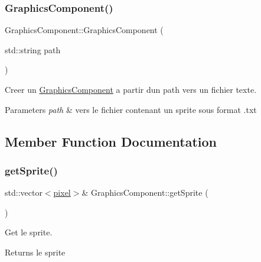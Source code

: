 \subsubsection{\texorpdfstring{Graphics\+Component()}{GraphicsComponent()}}
{\footnotesize\ttfamily Graphics\+Component\+::\+Graphics\+Component (\begin{DoxyParamCaption}\item[{std\+::string}]{path }\end{DoxyParamCaption})}



Creer un \hyperlink{class_graphics_component}{Graphics\+Component} a partir d\textquotesingle{}un path vers un fichier texte. 


\begin{DoxyParams}{Parameters}
{\em path} & vers le fichier contenant un sprite sous format .txt \\
\hline
\end{DoxyParams}


\subsection{Member Function Documentation}
\hypertarget{class_graphics_component_aa88d6da1d4cceb7bf2b16c0419312517}{}\label{class_graphics_component_aa88d6da1d4cceb7bf2b16c0419312517} 
\subsubsection{\texorpdfstring{get\+Sprite()}{getSprite()}}
{\footnotesize\ttfamily std\+::vector$<$\hyperlink{structpixel}{pixel}$>$\& Graphics\+Component\+::get\+Sprite (\begin{DoxyParamCaption}{ }\end{DoxyParamCaption})\hspace{0.3cm}{\ttfamily [inline]}}



Get le sprite. 

\begin{DoxyReturn}{Returns}
le sprite 
\end{DoxyReturn}
\hypertarget{class_graphics_component_ab3e309ee0a8dcbc1b927d38bf2e1d8c9}{}\label{class_graphics_component_ab3e309ee0a8dcbc1b927d38bf2e1d8c9} 
